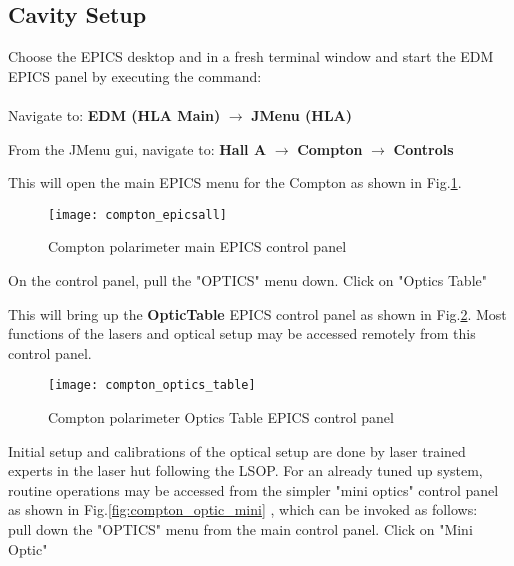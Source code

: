 \subsection{Cavity Setup}
Choose the EPICS desktop and in a fresh terminal window and start the EDM~\cite{MEDMwww} EPICS panel 
 by executing  the command:\\

\\

Navigate to:  {\bf EDM (HLA Main)}  $\rightarrow$  {\bf JMenu (HLA)}

From the JMenu gui, navigate to: {\bf Hall A}  $\rightarrow$  {\bf Compton} $\rightarrow$  {\bf Controls}


This will open the main EPICS menu for the Compton as shown in Fig.\ref{fig:compton_epicsall}.
 \begin{figure}[htp]
    \begin{center}
        \texttt{[image: compton\_epicsall]}
    \end{center}
    \caption[compton:epics main control]{Compton polarimeter main EPICS control panel}
    \label{fig:compton_epicsall}
 \end{figure}

On the control panel, pull the "OPTICS" menu down. Click on "Optics Table" 

	This will bring up the {\bf OpticTable} EPICS control panel as shown in Fig.\ref{fig:compton_table}. Most functions of the lasers and optical setup may be accessed remotely from this  control panel. 


 \begin{figure}[htp]
    \begin{center}
        \texttt{[image: compton\_optics\_table]}
    \end{center}
    \caption[compton:epics main control]{Compton polarimeter Optics Table  EPICS control panel}
    \label{fig:compton_table}
 \end{figure}

Initial setup and calibrations of the optical setup are done by laser trained experts in the laser hut following the LSOP\cite{compton_LSOP}. For an already tuned up system, routine operations  may be accessed from the simpler "mini optics" control panel as shown in  Fig.\ref{fig:compton_optic_mini} , which can be invoked as follows: \\ 

\noindent pull down the "OPTICS" menu from the main control panel. Click on "Mini Optic" 

